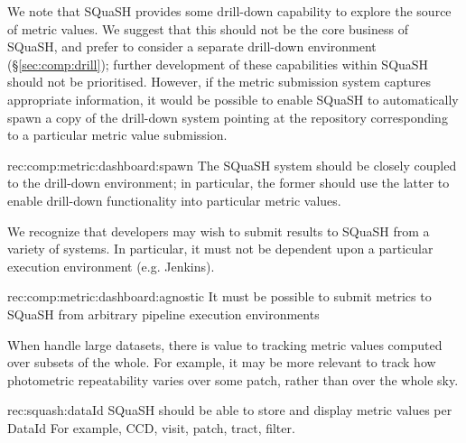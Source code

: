 We note that SQuaSH provides some drill-down capability to explore the source of metric values.
We suggest that this should not be the core business of SQuaSH, and prefer to consider a separate drill-down environment (\S\ref{sec:comp:drill}); further development of these capabilities within SQuaSH should not be prioritised.
However, if the metric submission system captures appropriate information, it would be possible to enable SQuaSH to automatically spawn a copy of the drill-down system pointing at the repository corresponding to a particular metric value submission.

\begin{recommendation}
  {rec:comp:metric:dashboard:spawn}
  {The SQuaSH system should be closely coupled to the drill-down environment; in particular, the former should use the latter to enable drill-down functionality into particular metric values.}
\end{recommendation}

We recognize that developers may wish to submit results to SQuaSH from a variety of systems.
In particular, it must not be dependent upon a particular execution environment (e.g. Jenkins).

\begin{recommendation}
    {rec:comp:metric:dashboard:agnostic}
    {It must be possible to submit metrics to SQuaSH from arbitrary pipeline execution environments}
\end{recommendation}

When handle large datasets, there is value to tracking metric values computed over subsets of the whole.
For example, it may be more relevant to track how photometric repeatability varies over some patch, rather than over the whole sky.

\begin{recommendation}
    {rec:squash:dataId}
    {SQuaSH should be able to store and display metric values per DataId}
    For example, CCD, visit, patch, tract, filter.
\end{recommendation}
